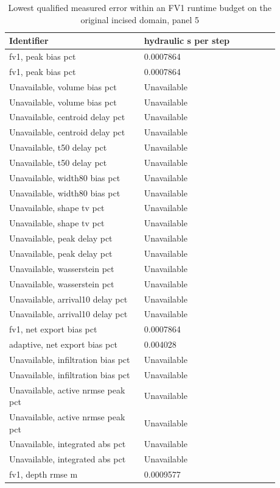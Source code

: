 \begin{longtable}{p{0.4400\linewidth}p{0.4400\linewidth}}
\caption{Lowest qualified measured error within an FV1 runtime budget on the original incised domain, panel 5}\\
\hline
Identifier & hydraulic s per step \\
\hline\endhead
fv1, peak bias pct & 0.0007864 \\
fv1, peak bias pct & 0.0007864 \\
Unavailable, volume bias pct & Unavailable \\
Unavailable, volume bias pct & Unavailable \\
Unavailable, centroid delay pct & Unavailable \\
Unavailable, centroid delay pct & Unavailable \\
Unavailable, t50 delay pct & Unavailable \\
Unavailable, t50 delay pct & Unavailable \\
Unavailable, width80 bias pct & Unavailable \\
Unavailable, width80 bias pct & Unavailable \\
Unavailable, shape tv pct & Unavailable \\
Unavailable, shape tv pct & Unavailable \\
Unavailable, peak delay pct & Unavailable \\
Unavailable, peak delay pct & Unavailable \\
Unavailable, wasserstein pct & Unavailable \\
Unavailable, wasserstein pct & Unavailable \\
Unavailable, arrival10 delay pct & Unavailable \\
Unavailable, arrival10 delay pct & Unavailable \\
fv1, net export bias pct & 0.0007864 \\
adaptive, net export bias pct & 0.004028 \\
Unavailable, infiltration bias pct & Unavailable \\
Unavailable, infiltration bias pct & Unavailable \\
Unavailable, active nrmse peak pct & Unavailable \\
Unavailable, active nrmse peak pct & Unavailable \\
Unavailable, integrated abs pct & Unavailable \\
Unavailable, integrated abs pct & Unavailable \\
fv1, depth rmse m & 0.0009577 \\

\end{longtable}
